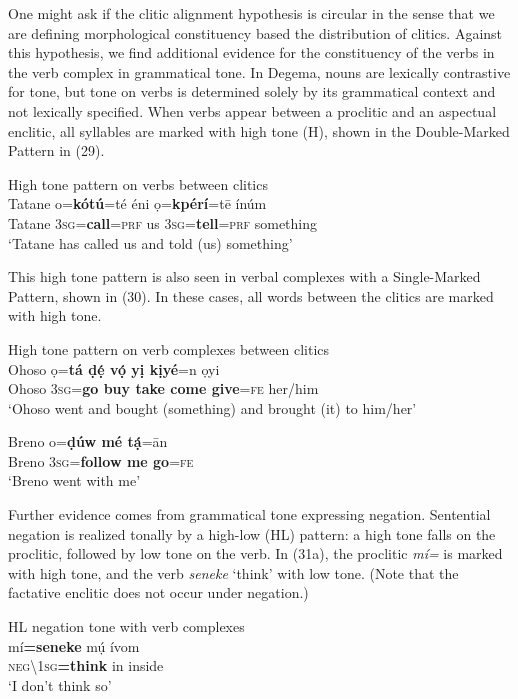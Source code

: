 \documentclass[output=paper]{langsci/langscibook}
\begin{document}
One might ask if the clitic alignment hypothesis is circular in the sense that we are defining morphological constituency based the distribution of clitics. Against this hypothesis, we find additional evidence for the constituency of the verbs in the verb complex in grammatical tone. In Degema, nouns are lexically contrastive for tone, but tone on verbs is determined solely by its grammatical context and not lexically specified. When verbs appear between a proclitic and an aspectual enclitic, all syllables are marked with high tone (H), shown in the Double-Marked Pattern in (29).

\ea
{High tone pattern on verbs between clitics}\\
\gll  Tatane  o=\textbf{kótú}=té     éni   ọ=\textbf{kpérí}=t\={e}     ínúm\\
     Tatane  3\textsc{sg}=\textbf{call}=\textsc{prf}   us   3\textsc{sg}=\textbf{tell}=\textsc{prf}  something\\
\glt ‘Tatane has called us and told (us) something’ \citep[285]{Kari2003a} 
\z

This high tone pattern is also seen in verbal complexes with a Single-Marked Pattern, shown in (30). In these cases, all words between the clitics are marked with high tone. 


\ea
{High tone pattern on verb complexes between clitics }\\
\gll   Ohoso   ọ=\textbf{tá  ḍẹ́    vọ́    yị    kịyé}=n   ọyi\\
     Ohoso    \textsc{3sg}=\textbf{go  buy    take  come  give}=\textsc{fe}   her/him\\
\glt ‘Ohoso went and bought (something) and brought (it) to him/her’ \citep[121]{Kari2004}
\z

\ea
\gll   Breno   o=\textbf{ḍúw    mé   tạ́}=\={a}n\\
     Breno   3\textsc{sg}=\textbf{follow  me   go}=\textsc{fe}\\
\glt ‘Breno went with me’ \citep[115]{Kari2004}
\z

Further evidence comes from grammatical tone expressing negation. Sentential negation is realized tonally by a high-low (HL) pattern: a high tone falls on the proclitic, followed by low tone on the verb. In (31a), the proclitic \textit{mí=} is marked with high tone, and the verb \textit{seneke} ‘think’ with low tone. (Note that the factative enclitic does not occur under negation.)

\ea
{HL negation tone with verb complexes }\\
\gll   mí\textbf{=seneke}      mụ́   ívom\\
     \textsc{neg{\textbackslash}1sg}\textbf{=think}    in   inside\\
\glt ‘I don’t think so’ \citep[32]{Kari2004}
\z
\end{document}
